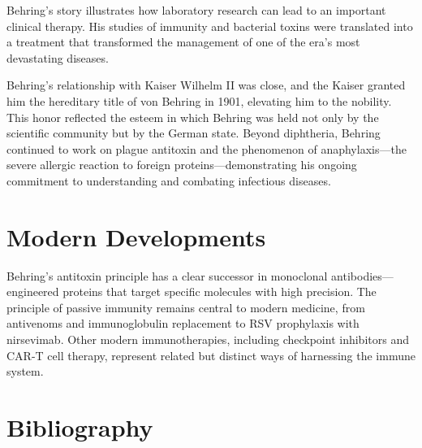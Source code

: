Behring's story illustrates how laboratory research can lead to an important clinical therapy. His studies of immunity and bacterial toxins were translated into a treatment that transformed the management of one of the era's most devastating diseases.

Behring's relationship with Kaiser Wilhelm II was close, and the Kaiser granted him the hereditary title of von Behring in 1901, elevating him to the nobility. This honor reflected the esteem in which Behring was held not only by the scientific community but by the German state. Beyond diphtheria, Behring continued to work on plague antitoxin and the phenomenon of anaphylaxis---the severe allergic reaction to foreign proteins---demonstrating his ongoing commitment to understanding and combating infectious diseases.

\section{Modern Developments}

Behring's antitoxin principle has a clear successor in monoclonal antibodies---engineered proteins that target specific molecules with high precision. The principle of passive immunity remains central to modern medicine, from antivenoms and immunoglobulin replacement to RSV prophylaxis with nirsevimab. Other modern immunotherapies, including checkpoint inhibitors and CAR-T cell therapy, represent related but distinct ways of harnessing the immune system.


\section{Bibliography}

